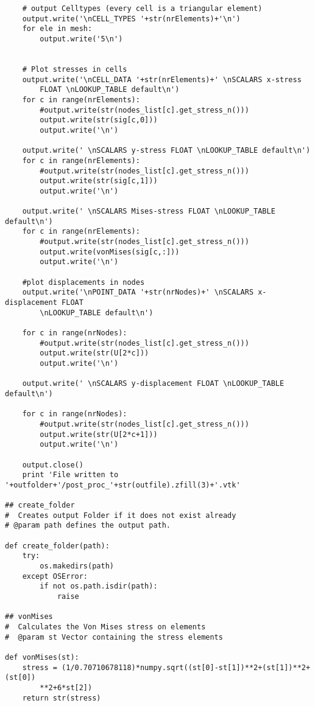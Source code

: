 \begin{appendices}
\begin{verbatim}
    # output Celltypes (every cell is a triangular element)
    output.write('\nCELL_TYPES '+str(nrElements)+'\n')
    for ele in mesh:
        output.write('5\n')


    # Plot stresses in cells
    output.write('\nCELL_DATA '+str(nrElements)+' \nSCALARS x-stress 
    	FLOAT \nLOOKUP_TABLE default\n')
    for c in range(nrElements):
        #output.write(str(nodes_list[c].get_stress_n()))
        output.write(str(sig[c,0]))
        output.write('\n')

    output.write(' \nSCALARS y-stress FLOAT \nLOOKUP_TABLE default\n')
    for c in range(nrElements):
        #output.write(str(nodes_list[c].get_stress_n()))
        output.write(str(sig[c,1]))
        output.write('\n')

    output.write(' \nSCALARS Mises-stress FLOAT \nLOOKUP_TABLE default\n')
    for c in range(nrElements):
        #output.write(str(nodes_list[c].get_stress_n()))
        output.write(vonMises(sig[c,:]))
        output.write('\n')

    #plot displacements in nodes
    output.write('\nPOINT_DATA '+str(nrNodes)+' \nSCALARS x-displacement FLOAT 
    	\nLOOKUP_TABLE default\n')

    for c in range(nrNodes):
        #output.write(str(nodes_list[c].get_stress_n()))
        output.write(str(U[2*c]))
        output.write('\n')

    output.write(' \nSCALARS y-displacement FLOAT \nLOOKUP_TABLE default\n')

    for c in range(nrNodes):
        #output.write(str(nodes_list[c].get_stress_n()))
        output.write(str(U[2*c+1]))
        output.write('\n')

    output.close()
    print 'File written to '+outfolder+'/post_proc_'+str(outfile).zfill(3)+'.vtk'

## create_folder
#  Creates output Folder if it does not exist already
# @param path defines the output path.

def create_folder(path):
    try:
        os.makedirs(path)
    except OSError:
        if not os.path.isdir(path):
            raise

## vonMises
#  Calculates the Von Mises stress on elements
#  @param st Vector containing the stress elements

def vonMises(st):
    stress = (1/0.70710678118)*numpy.sqrt((st[0]-st[1])**2+(st[1])**2+(st[0])
    	**2+6*st[2])
    return str(stress)
\end{verbatim}



\end{appendices}
